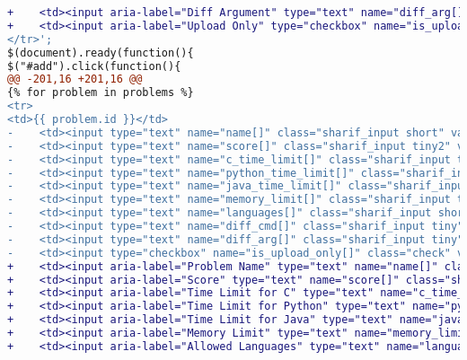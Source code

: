 \begin{itemize}
\begin{lstlisting}[language=diff, caption=Perubahan untuk mematuhi kriteria 1.3.1, label=lst_1.3.1, basicstyle=\ttfamily, frame=single,
columns=fullflexible, keepspaces=true, breaklines=true]
+    <td><input aria-label="Diff Argument" type="text" name="diff_arg[]" class="sharif_input tiny" value="-bB"/></td>\
+    <td><input aria-label="Upload Only" type="checkbox" name="is_upload_only[]" class="check" value="PID"/><td><i class="fa fa-times-circle fa-lg color1 delete_problem pointer"></i></td></td>\
</tr>';
$(document).ready(function(){
$("#add").click(function(){
@@ -201,16 +201,16 @@
{% for problem in problems %}
<tr>
<td>{{ problem.id }}</td>
-    <td><input type="text" name="name[]" class="sharif_input short" value="{{ problem.name }}"/></td>
-    <td><input type="text" name="score[]" class="sharif_input tiny2" value="{{ problem.score }}"/></td>
-    <td><input type="text" name="c_time_limit[]" class="sharif_input tiny2" value="{{ problem.c_time_limit }}"/></td>
-    <td><input type="text" name="python_time_limit[]" class="sharif_input tiny2" value="{{ problem.python_time_limit }}"/></td>
-    <td><input type="text" name="java_time_limit[]" class="sharif_input tiny2" value="{{ problem.java_time_limit }}"/></td>
-    <td><input type="text" name="memory_limit[]" class="sharif_input tiny" value="{{ problem.memory_limit }}"/></td>
-    <td><input type="text" name="languages[]" class="sharif_input short2" value="{{ problem.allowed_languages }}"/></td>
-    <td><input type="text" name="diff_cmd[]" class="sharif_input tiny" value="{{ problem.diff_cmd }}"/></td>
-    <td><input type="text" name="diff_arg[]" class="sharif_input tiny" value="{{ problem.diff_arg }}"/></td>
-    <td><input type="checkbox" name="is_upload_only[]" class="check" value="{{ problem.id }}" {{ problem.is_upload_only ? 'checked' }}/></td>
+    <td><input aria-label="Problem Name" type="text" name="name[]" class="sharif_input short" value="{{ problem.name }}"/></td>
+    <td><input aria-label="Score" type="text" name="score[]" class="sharif_input tiny2" value="{{ problem.score }}"/></td>
+    <td><input aria-label="Time Limit for C" type="text" name="c_time_limit[]" class="sharif_input tiny2" value="{{ problem.c_time_limit }}"/></td>
+    <td><input aria-label="Time Limit for Python" type="text" name="python_time_limit[]" class="sharif_input tiny2" value="{{ problem.python_time_limit }}"/></td>
+    <td><input aria-label="Time Limit for Java" type="text" name="java_time_limit[]" class="sharif_input tiny2" value="{{ problem.java_time_limit }}"/></td>
+    <td><input aria-label="Memory Limit" type="text" name="memory_limit[]" class="sharif_input tiny" value="{{ problem.memory_limit }}"/></td>
+    <td><input aria-label="Allowed Languages" type="text" name="languages[]" class="sharif_input short2" value="{{ problem.allowed_languages }}"/></td>

\end{lstlisting}
\end{itemize}

